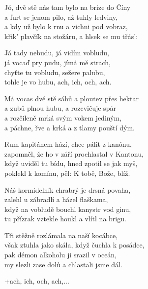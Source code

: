 
\ve{}
Jó, dvě stě nás tam bylo na brize do Číny\\
a furt se jenom pilo, až tuhly ledviny,\\
a kdy už bylo k rnu a vichni pod vobraz,\\
křik' plavčík na stožáru, a hlsek se mu třás':

\cho{}
Já tady nebudu, já vidím vobludu,\\
já vocaď pry pudu, jímá mě strach,\\
chyťte tu vobludu, sežere palubu,\\
tohle je vo hubu, ach, ich, och, ach.

\ve{}
Má vocas dvě stě sáhů a ploutev přes hektar\\
a zubů plnou hubu, a rozcvičuje spár\\
a rozčileně mrká svým vokem jediným,\\
a páchne, řve a krká a z tlamy pouští dým.

\cho{}

\ve{}
Rum kapitánem hází, chce pálit z kanónu,\\
zapomněl, že ho v září prochlastal v Kantonu,\\
když uviděl tu bídu, hned zpotil se jak myš,\\
poklekl k komínu, pěl: K tobě, Bože, blíž.

\cho{}

\ve{}
Náš kormidelník chrabrý je drsná povaha,\\
zalehl u zábradlí a házel flaškama,\\
když na vobludě bouchl kanystr vod ginu,\\
tu přízrak vztekle houkl a vlítl na brigu.

\cho{}

\ve{}
Tři stěžně rozlámala na naší kocábce,\\
však ztuhla jako skála, když čuchla k posádce,\\
pak démon alkoholu ji srazil v oceán,\\
my slezli zase dolů a chlastali jsme dál.

\cho{}
+ach, ich, och, ach,...

\esong{}